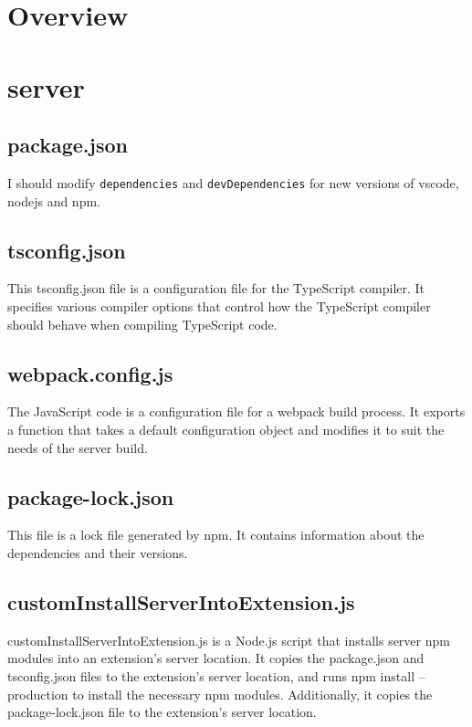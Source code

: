 \documentclass[12pt]{article}
\begin{document}
 
%

\rhead{\today}
 
\section{Overview}

\section{server}
\subsection{package.json}

I should modify \texttt{dependencies} and \texttt{devDependencies} for new versions of vscode, nodejs and npm.

\subsection{tsconfig.json}
This tsconfig.json file is a configuration file for the TypeScript compiler. It specifies various compiler options that control how the TypeScript compiler should behave when compiling TypeScript code.

\subsection{webpack.config.js}
The JavaScript code is a configuration file for a webpack build process. It exports a function that takes a default configuration object and modifies it to suit the needs of the server build.

\subsection{package-lock.json}
This file is a lock file generated by npm. It contains information about the dependencies and their versions.

\subsection{customInstallServerIntoExtension.js}
customInstallServerIntoExtension.js is a Node.js script that installs server npm modules into an extension's server location. It copies the package.json and tsconfig.json files to the extension's server location, and runs npm install --production to install the necessary npm modules. Additionally, it copies the package-lock.json file to the extension's server location.
\end{document}
